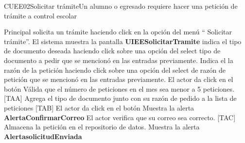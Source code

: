 \begin{UseCase}{CUEE02}{Solicitar trámite}{Un alumno o egresado requiere hacer una petición de trámite a control escolar}
{  }
\end{UseCase}

\begin{UCtrayectoria}{Principal}
  \UCpaso[\UCactor] solicita un trámite haciendo click en la opción del menú `` Solicitar trámite”.
  \UCpaso El sistema muestra la pantalla  {\bf UIEESolicitarTramite}
  \UCpaso[\UCactor] indica el tipo de documento deseada haciendo click sobre una opción del select tipo de documento a pedir  que se mencionó en las entradas previamente.
  \UCpaso[\UCactor] Indica el la razón de la petición haciendo click sobre una opción del select de razón de petición que se mencionó en las entradas previamente.
  \UCpaso[\UCactor] El actor da click en el botón 
  \UCpaso  Válida que el número de peticiones en el mes sea menor a 5 peticiones.[TAA] 
  \UCpaso Agrega el tipo de documento junto con su razón de pedido a la lista de peticiones [TAB]
  \UCpaso[\UCactor] El actor da click en el botón 
  \UCpaso Muestra la alerta {\bf AlertaConfirmarCorreo} 
  \UCpaso[\UCactor] El actor verifica que su correo sea correcto. [TAC]
  \UCpaso Almacena la petición en el repositorio de datos.
  \UCpaso Muestra la alerta  {\bf AlertasolicitudEnviada}
\end{UCtrayectoria}

